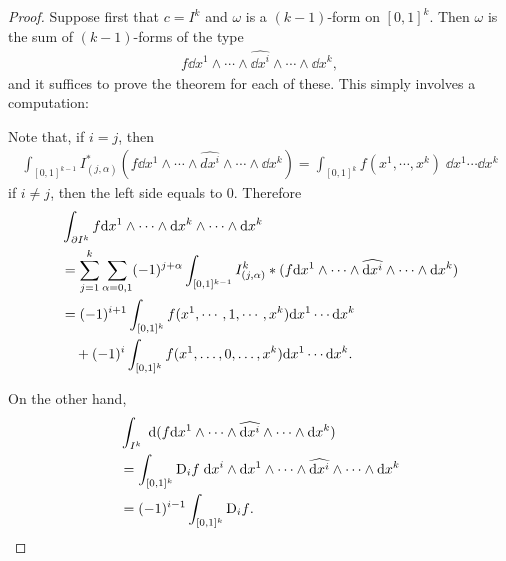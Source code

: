 \begin{proof}
    Suppose first that $c = I^k$ and $\omega$ is a $(k-1)$-form on $[0,1]^k$.
    Then $\omega$ is the sum of $(k-1)$-forms of the type
    \begin{align*}
      f\dd x^1\wedge\cdots\wedge\widehat{\dd x^i}\wedge\cdots\wedge \dd x^k,
    \end{align*}
    and it suffices to prove the theorem for each of these. This simply involves a 
    computation:

    Note that, if $i=j$, then
    \begin{align*}
      \int_{[0,1]^{k-1}}I_{(j,{\alpha})}^{*}(f\dd x^1\wedge\cdots\wedge\widehat{dx^i}\wedge\cdots\wedge \dd x^k) 
      = \int_{[0,1]^k} f(x^1,\cdots,x^k)\;\dd x^1\cdots\dd x^k
    \end{align*}
    if $i\neq j$, then the left side equals to 0. Therefore 
    \begin{align*}
        & \int_{\partial I^k} f\mathrm{d} x^1\wedge\cdots\wedge \mathrm{d} x^k\wedge\cdots\wedge\mathrm{d} x^k \\
        & = \sum_{j=1}^{k}\sum_{\alpha=0,1}(-1)^{j+\alpha}\int_{[0,1]^{k-1}}I_{(j,\alpha)}^{k}*(f\mathrm{d} x^1\wedge\cdots\wedge\widehat{\mathrm{d} x^i}\wedge\cdots\wedge\mathrm{d} x^k) \\
        & = (-1)^{i+1}\int_{[0,1]^k}f(x^1,\cdots, 1, \cdots,x^k)\mathrm{d} x^1\cdots \mathrm{d} x^k \\
        & \hspace*{1em} +(-1)^i\int_{[0,1]^k}f(x^1,\ldots,0,\ldots,x^k)\mathrm{d} x^1\cdots \mathrm{d} x^k.
    \end{align*}

    On the other hand,
    \begin{align*}
        & \int_{I^{k}}\;\mathrm{d}(f \mathrm{d} x^1\wedge\cdots\wedge\widehat{\mathrm{d} x^i}\wedge\cdots\wedge \mathrm{d} x^k) \\
        & = \int_{[0,1]^k}\mathrm{D}_i f\;\mathrm{d} x^i\wedge\mathrm{d} x^1\wedge\cdots\wedge\widehat{\mathrm{d} x^i}\wedge\cdots\wedge\mathrm{d} x^k \\
        & = (-1)^{i-1}\int_{[0,1]^k} {\mathrm{D}_i f}.
    \end{align*}


\end{proof}
